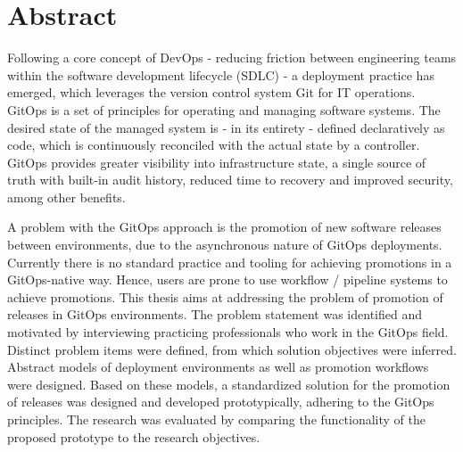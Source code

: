 \chapter{Abstract}

%








Following a core concept of DevOps
- reducing friction between engineering teams within the software development lifecycle (SDLC) -
a deployment practice has emerged,
which leverages the version control system Git for IT operations.
GitOps is a set of principles for operating and managing software systems.
The desired state of the managed system is
- in its entirety -
defined declaratively as code,
which is continuously reconciled with the actual state by a controller.
GitOps provides greater visibility into infrastructure state,
a single source of truth with built-in audit history,
reduced time to recovery and improved security,
among other benefits.

A problem with the GitOps approach is the promotion of new software releases between environments,
due to the asynchronous nature of GitOps deployments.
Currently there is no standard practice and tooling for achieving promotions in a GitOps-native way.
Hence, users are prone to use workflow / pipeline systems to achieve promotions.
This thesis aims at addressing the problem of
promotion of releases in GitOps environments.
The problem statement was identified and motivated by
interviewing practicing professionals who work in the GitOps field.
Distinct problem items were defined, from which solution objectives were inferred.
Abstract models of deployment environments as well as promotion workflows
were designed.
Based on these models,
a standardized solution for the promotion of releases
was designed and developed prototypically,
adhering to the GitOps principles.
The research was evaluated by
comparing the functionality of the proposed prototype
to the research objectives.

